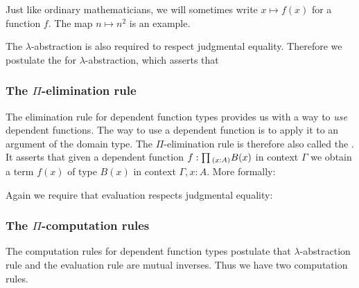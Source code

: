 Just like ordinary mathematicians, we will sometimes write $x\mapsto f(x)$ for a function $f$. The map $n\mapsto n^2$ is an example.

The $\lambda$-abstraction is also required to respect judgmental equality. Therefore we postulate the  for $\lambda$-abstraction,
which asserts that
\begin{prooftree}
\end{prooftree}

\subsubsection{The $\Pi$-elimination rule}

The elimination rule for dependent function types provides us with a way to \emph{use} dependent functions. The way to use a dependent function is to apply it to an argument of the domain type. The $\Pi$-elimination rule is therefore also called the . It asserts that given a dependent function $f:\prd{x:A}B(x)$ in context $\Gamma$ we obtain a term $f(x)$ of type $B(x)$ in context $\Gamma,x:A$. More formally:
\begin{prooftree}
\end{prooftree}
Again we require that evaluation respects judgmental equality:
\begin{prooftree}
\end{prooftree}

\subsubsection{The $\Pi$-computation rules}

The computation rules for dependent function types postulate that $\lambda$-abstraction rule and the evaluation rule are mutual inverses. Thus we have two computation rules.

